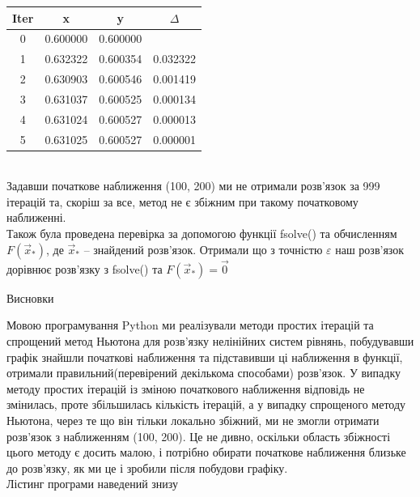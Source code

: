 \documentclass[14 pt]{extarticle}
\begin{document}
\begin{tabular}{|c|c|c|c|} \hline
    Iter & x & y & $\Delta$ \\ \hline
    0 & 0.600000 & 0.600000 &   \\ \hline
    1 & 0.632322 & 0.600354 & 0.032322 \\ \hline
    2 & 0.630903 & 0.600546 & 0.001419 \\ \hline
    3 & 0.631037 & 0.600525 & 0.000134 \\ \hline
    4 & 0.631024 & 0.600527 & 0.000013 \\ \hline
    5 & 0.631025 & 0.600527 & 0.000001 \\ \hline
\end{tabular} \\ 
Задавши початкове наближення (100, 200) ми не отримали розв'язок за 999 ітерацій та, скоріш за все,
метод не є збіжним при такому початковому наближенні. \\ 
Також була проведена перевірка за допомогою функції fsolve() та обчисленням $F(\vec{x}_*)$,
де $\vec{x}_*$ -- знайдений розв'язок. Отримали що з точністю $\varepsilon$
наш розв'язок дорівнює розв'язку з fsolve() та $F(\vec{x}_*) = \vec{0}$    
\begin{center}
    \Large
    Висновки
\end{center}
Мовою програмування Python ми реалізували методи простих ітерацій та спрощений метод Ньютона
для розв'язку нелінійних систем рівнянь, побудувавши графік знайшли початкові наближення
та підставивши ці наближення в функції, отримали правильний(перевірений декількома способами)
розв'язок. У випадку методу простих ітерацій із зміною початкового наближення відповідь
не змінилась, проте збільшилась кількість ітерацій, а у випадку спрощеного методу Ньютона,
через те що він тільки локально збіжний, ми не змогли отримати розв'язок з наближенням (100, 200). 
Це не дивно, оскільки область збіжності цього методу є досить малою, і потрібно обирати
початкове наближення близьке до розв'язку, як ми це і зробили після побудови графіку. \\ 
Лістинг програми наведений знизу \\ 

\end{document}
